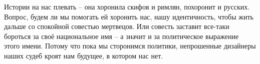 Истории на нас плевать – она хоронила скифов и римлян, похоронит и русских.
Вопрос, будем ли мы помогать ей хоронить нас, нашу идентичность, чтобы жить
дальше со спокойной совестью мертвецов. Или совесть заставит все-таки бороться
за своё национальное имя – а значит и за политическое выражение этого имени.
Потому что пока мы сторонимся политики, непрошенные дизайнеры наших судеб кроят
нам будущее, в котором нас нет.
